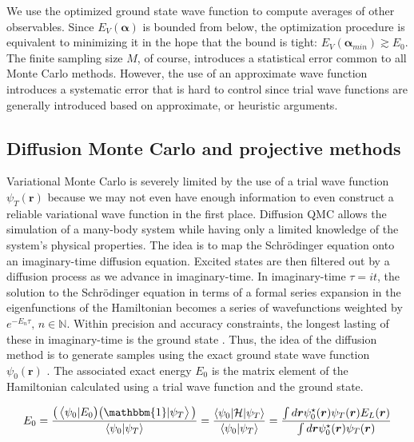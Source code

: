 We use the optimized ground state wave  function to compute averages of other observables.
Since $E_V(\bm \alpha)$ is bounded from below, the optimization procedure is equivalent to minimizing it in the hope that the bound is tight: $E_V(\bm \alpha_{min}) \gtrsim E_0$.
The finite sampling size $M$, of course, introduces a statistical error common to all Monte Carlo methods. 
However, the use of an approximate wave function introduces a systematic error that is hard to control since trial wave functions are generally introduced based on approximate, or heuristic arguments.

\subsection{Diffusion Monte Carlo and projective methods}\label{subsec:dmc}

Variational Monte Carlo is severely limited by the use of a trial wave function $\psi_T (\bm r)$ because we may not even have enough information to even construct a reliable variational wave function in the first place.
Diffusion \ac{QMC} allows the simulation of a many-body system while having only a limited knowledge of the system's physical properties.
The idea is to map the Schr\"odinger equation onto an imaginary-time diffusion equation.
Excited states are then filtered out by a diffusion process as we advance in imaginary-time.
In imaginary-time $\tau = i t$, the solution to the Schr\"odinger equation in terms of a formal series expansion in the eigenfunctions of the Hamiltonian becomes a series of  wavefunctions weighted by $e^{-E_n \tau}, \, n \in \mathbb{N}$.
Within precision and accuracy constraints, the longest lasting of these in imaginary-time is the ground state \cite{kosztin_introduction_1996}.
Thus, the idea of the diffusion method is to generate samples using the exact ground state wave function $\psi_0 (\bm r)$ \cite{toulouse_chapter_2016}.
The associated exact energy $E_0$ is the matrix element of the Hamiltonian calculated using a trial wave function and the ground state.

\begin{equation}
E_0 = \frac{ \big( \left\langle \psi_0 |E_0 \big) \big( \mathbbm{1} | \psi_T \right\rangle \big)}{\left\langle \psi_0 | \psi_T \right\rangle} = \frac{\left\langle \psi_0 | \mathcal{H} | \psi_T \right\rangle}{ \left\langle\psi_0 | \psi_T \right\rangle} = \frac{\int d\bm r \psi_0^\star (\bm r) \psi_T (\bm r) E_L (\bm r)}{\int d\bm r\psi_0^\star (\bm r) \psi_T (\bm r)}
\end{equation}

